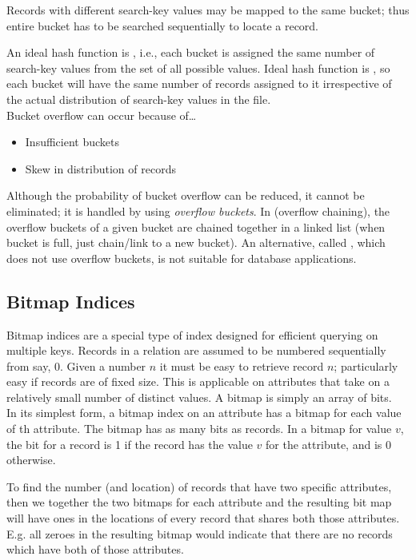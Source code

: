 \documentclass{article}
\begin{document}
\begin{remark}
  Records with different search-key values may be mapped to the same bucket; thus entire bucket has to be searched sequentially to locate a record.
\end{remark}

An ideal hash function is , i.e., each bucket is assigned the same number of search-key values from the set of all possible values. Ideal hash function is , so each bucket will have the same number of records assigned to it irrespective of the actual distribution of search-key values in the file. \\ 

Bucket overflow can occur because of\dots 
\begin{itemize}
  \item Insufficient buckets 
  \item Skew in distribution of records 
\end{itemize}
Although the probability of bucket overflow can be reduced, it cannot be eliminated; it is handled by using \emph{overflow buckets}. In  (overflow chaining), the overflow buckets of a given bucket are chained together in a linked list (when bucket is full, just chain/link to a new bucket). An alternative, called , which does not use overflow buckets, is not suitable for database applications.  

\subsection{Bitmap Indices}

Bitmap indices are a special type of index designed for efficient querying on multiple keys. Records in a relation are assumed to be numbered sequentially from say, 0. Given a number $n$ it must be easy to retrieve record $n$; particularly easy if records are of fixed size. This is applicable on attributes that take on a relatively small number of distinct values. A bitmap is simply an array of bits. \\

In its simplest form, a bitmap index on an attribute has a bitmap for each value of th attribute. The bitmap has as many bits as records. In a bitmap for value $v$, the bit for a record is 1 if the record has the value $v$ for the attribute, and is 0 otherwise.  

\begin{remark}
  To find the number (and location) of records that have two specific attributes, then we  together the two bitmaps for each attribute and the resulting bit map will have ones in the locations of every record that shares both those attributes. E.g. all zeroes in the resulting bitmap would indicate that there are no records which have both of those attributes. 
\end{remark}
\end{document}
